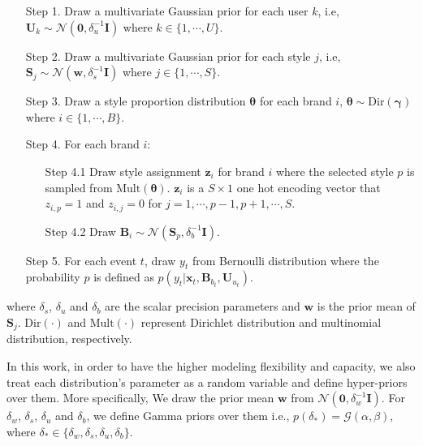 \begin{enumerate}
\item[Step 1.] Draw a multivariate Gaussian prior for each user $k$, i.e, $\mathbf{U}_k \sim \mathcal{N}(\mathbf{0}, \delta_u^{-1}\mathbf{I})$ where $k \in \{1, \cdots, U\}$.

\item[Step 2.] Draw a multivariate Gaussian prior for each style $j$, i.e, $\mathbf{S}_j \sim \mathcal{N}(\mathbf{w}, \delta_s^{-1}\mathbf{I})$ where $j \in \{1, \cdots, S\}$.

\item[Step 3.] Draw a style proportion distribution $\boldsymbol{\theta}$ for each brand $i$, $\boldsymbol{\theta} \sim \mbox{Dir}(\boldsymbol{\gamma})$  where $i \in \{1, \cdots, B\}$.

\item[Step 4.] For each brand $i$:
	\begin{enumerate}
		\item[Step 4.1] Draw style assignment $\mathbf{z}_i$ for brand $i$ where the selected style $p$ is sampled from $\mbox{Mult}(\boldsymbol{\theta})$. $\mathbf{z}_i$ is a $S\times1$ one hot encoding vector that $z_{i,p} = 1$ and $z_{i,j} = 0$ for $j = 1, \cdots, p-1, p+1, \cdots, S$.
		\item[Step 4.2] Draw $\mathbf{B}_i \sim \mathcal{N}(\mathbf{S}_{p}, \delta_b^{-1}\mathbf{I})$.
	\end{enumerate}

\item[Step 5.] For each event $t$, draw $y_t$ from Bernoulli distribution where the probability $p$ is defined as $p(y_t|\mathbf{x}_t, \mathbf{B}_{b_t}, \mathbf{U}_{u_t})$.
\end{enumerate}

\noindent where $\delta_s$, $\delta_u$ and $\delta_b$ are the scalar precision parameters and $\mathbf{w}$ is the prior mean of $\mathbf{S}_j$. $\mbox{Dir}(\cdot)$ and  $\mbox{Mult}(\cdot)$ represent Dirichlet distribution and multinomial distribution, respectively. 

In this work, in order to have the higher modeling flexibility and capacity, we also treat each distribution's parameter as a random variable and define hyper-priors over them. More specifically, We draw the prior mean $\mathbf{w}$ from $\mathcal{N}(\mathbf{0}, \delta_w^{-1}\mathbf{I})$. For $\delta_w$, $\delta_s$, $\delta_u$ and $\delta_b$, we define Gamma priors over them i.e.,  $p(\delta_*) = \mathcal{G}(\alpha, \beta)$, where $\delta_* \in \{ \delta_w, \delta_s, \delta_u, \delta_b \}$. 

